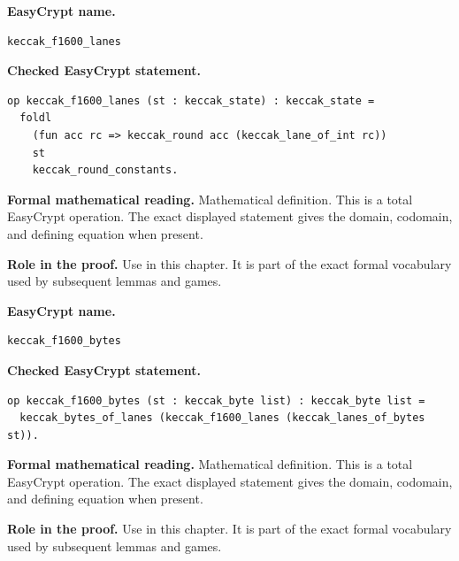 \begin{formaldefinition}
\noindent\textbf{EasyCrypt name.}
\begin{lstlisting}[language=EasyCrypt,basicstyle=\ttfamily\scriptsize]
keccak_f1600_lanes
\end{lstlisting}
\noindent\textbf{Checked EasyCrypt statement.}
\begin{lstlisting}[language=EasyCrypt,basicstyle=\ttfamily\scriptsize]
op keccak_f1600_lanes (st : keccak_state) : keccak_state =
  foldl
    (fun acc rc => keccak_round acc (keccak_lane_of_int rc))
    st
    keccak_round_constants.
\end{lstlisting}
\noindent\textbf{Formal mathematical reading.}
Mathematical definition. This is a total EasyCrypt operation.  The exact displayed statement gives the domain, codomain, and defining equation when present.

\noindent\textbf{Role in the proof.}
Use in this chapter. It is part of the exact formal vocabulary used by subsequent lemmas and games.

\end{formaldefinition}

\begin{formaldefinition}
\noindent\textbf{EasyCrypt name.}
\begin{lstlisting}[language=EasyCrypt,basicstyle=\ttfamily\scriptsize]
keccak_f1600_bytes
\end{lstlisting}
\noindent\textbf{Checked EasyCrypt statement.}
\begin{lstlisting}[language=EasyCrypt,basicstyle=\ttfamily\scriptsize]
op keccak_f1600_bytes (st : keccak_byte list) : keccak_byte list =
  keccak_bytes_of_lanes (keccak_f1600_lanes (keccak_lanes_of_bytes st)).
\end{lstlisting}
\noindent\textbf{Formal mathematical reading.}
Mathematical definition. This is a total EasyCrypt operation.  The exact displayed statement gives the domain, codomain, and defining equation when present.

\noindent\textbf{Role in the proof.}
Use in this chapter. It is part of the exact formal vocabulary used by subsequent lemmas and games.

\end{formaldefinition}

